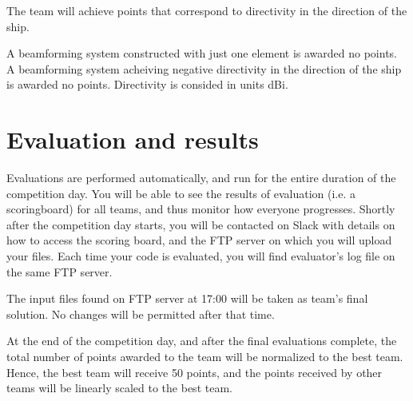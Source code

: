 \documentclass{article}[a4paper]
\begin{document}
The team will achieve points that correspond to directivity in the direction of the ship.

A beamforming system constructed with just one element is awarded no points. A beamforming system acheiving negative directivity in the direction of the ship is awarded no points. Directivity is consided in units dBi.

\section{Evaluation and results}

Evaluations are performed automatically, and run for the entire duration of the competition day. You will be able to see the results of evaluation (i.e. a scoringboard) for all teams, and thus monitor how everyone progresses. Shortly after the competition day starts, you will be contacted on Slack with details on how to access the scoring board, and the FTP server on which you will upload your files. Each time your code is evaluated, you will find evaluator's log file on the same FTP server.

The input files found on FTP server at 17:00 will be taken as team's final solution. No changes will be permitted after that time.

At the end of the competition day, and after the final evaluations complete, the total number of points awarded to the team will be normalized to the best team. Hence, the best team will receive 50 points, and the points received by other teams will be linearly scaled to the best team.
\end{document}
